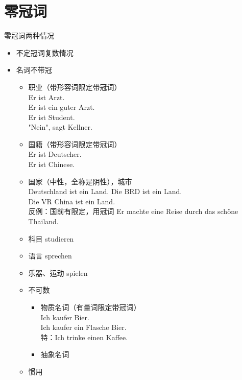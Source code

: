 \section{零冠词}
零冠词两种情况
\begin{itemize}
    \item 不定冠词复数情况
    \item 名词不带冠
          \begin{itemize}
              \item 职业（带形容词限定带冠词） \\
                    Er ist Arzt. \\
                    Er ist ein guter Arzt. \\
                    Er ist Student. \\
                    "Nein", sagt Kellner.
              \item 国籍（带形容词限定带冠词） \\
                    Er ist Deutscher. \\
                    Er ist Chinese. \\
              \item 国家（中性，全称是阴性），城市 \\
                    Deutschland ist ein Land. Die BRD ist ein Land. \\
                    Die VR China ist ein Land. \\
                    反例：国前有限定，用冠词 Er machte eine Reise durch das schöne Thailand. \\
              \item 科目 studieren
              \item 语言 sprechen
              \item 乐器、运动 spielen
              \item 不可数
                    \begin{itemize}
                        \item 物质名词（有量词限定带冠词）\\
                              Ich kaufer Bier. \\
                              Ich kaufer ein Flasche Bier.\\
                              特：Ich trinke einen Kaffee.\\
                        \item 抽象名词
                    \end{itemize}
              \item 惯用

\end{itemize}
\end{itemize}
